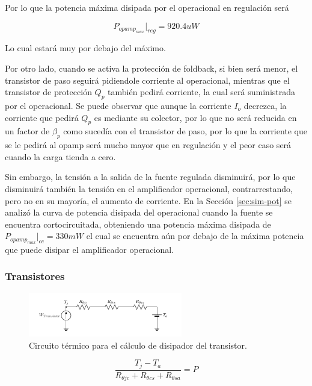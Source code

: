 Por lo que la potencia máxima disipada por el operacional en regulación será

\begin{equation}
P_{opamp_{max}}|_{reg} = 920.4uW
\end{equation}

Lo cual estará muy por debajo del máximo.

Por otro lado, cuando se activa la protección de foldback, si bien será menor, el transistor de paso seguirá pidiendole corriente al operacional, mientras que el transistor de protección $Q_p$ también pedirá corriente, la cual será suministrada por el operacional. Se puede observar que aunque la corriente $I_o$ decrezca, la corriente que pedirá $Q_p$ es mediante su colector, por lo que no será reducida en un factor de $\beta_p$ como sucedía con el transistor de paso, por lo que la corriente que se le pedirá al opamp será mucho mayor que en regulación y el peor caso será cuando la carga tienda a cero.

Sin embargo, la tensión a la salida de la fuente regulada disminuirá, por lo que disminuirá también la tensión en el amplificador operacional, contrarrestando, pero no en su mayoría, el aumento de corriente. En la Sección \ref{sec:sim-pot} se analizó la curva de potencia disipada del operacional cuando la fuente se encuentra cortocircuitada, obteniendo una potencia máxima disipada de $P_{opamp_{max}}|_{cc} = 330mW$ el cual se encuentra aún por debajo de la máxima potencia que puede disipar el amplificador operacional.

\subsubsection{Transistores}

\begin{figure}[H]
\centering
	\includegraphics[width=0.6\textwidth, page=1]{ImagenesEjercicio2/Potencia.pdf}
	\caption{Circuito térmico para el cálculo de disipador del transistor.}
	\label{fig:circuitopottrans}
\end{figure}

\begin{equation}
\frac{T_j - T_a}{R_{\theta jc}+R_{\theta cs}+R_{\theta sa}} = P
\end{equation}


